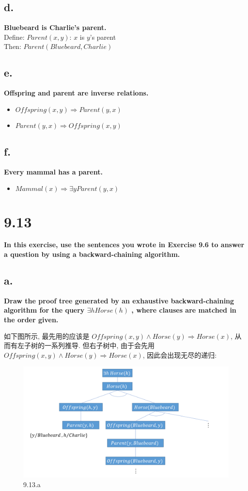\documentclass[UTF8]{article}
\newcommand{\jumpLine} {\hspace*{\fill} \par}
\begin{document}
\subsection*{d.}
\noindent \textbf{Bluebeard is Charlie’s parent.}\\
Define: $Parent(x,y)$: $x$ is $y$'s parent \\
Then: $Parent(Bluebeard, Charlie)$
\subsection*{e.}
\noindent \textbf{Offspring and parent are inverse relations.}
\begin{itemize}
	\item $Offspring(x,y)\Rightarrow Parent(y,x)$
	\item $Parent(y,x)\Rightarrow Offspring(x,y)$
\end{itemize}
\subsection*{f.}
\noindent \textbf{Every mammal has a parent. }
\begin{itemize}
	\item $Mammal(x)\Rightarrow \exists y Parent(y, x)$
\end{itemize}

\section*{9.13}
\noindent \textbf{In this exercise, use the sentences you wrote in Exercise 9.6 to answer a question by using a backward-chaining algorithm. }\\\jumpLine\noindent
\subsection*{a.}
\noindent \textbf{Draw the proof tree generated by an exhaustive backward-chaining algorithm for the query $\exists h Horse(h)$ , where clauses are matched in the order given.}\\\jumpLine\noindent
如下图所示, 最先用的应该是 $Offspring(x,y)\land Horse(y)\Rightarrow Horse(x)$, 从而有左子树的一系列推导. 但右子树中, 由于会先用 $Offspring(x,y)\land Horse(y)\Rightarrow Horse(x)$, 因此会出现无尽的递归:
\begin{figure}[H]
	\centering
	\includegraphics[width=\linewidth]{image/9.13.a.png}
	\caption{9.13.a}
\end{figure}\par
\end{document}
